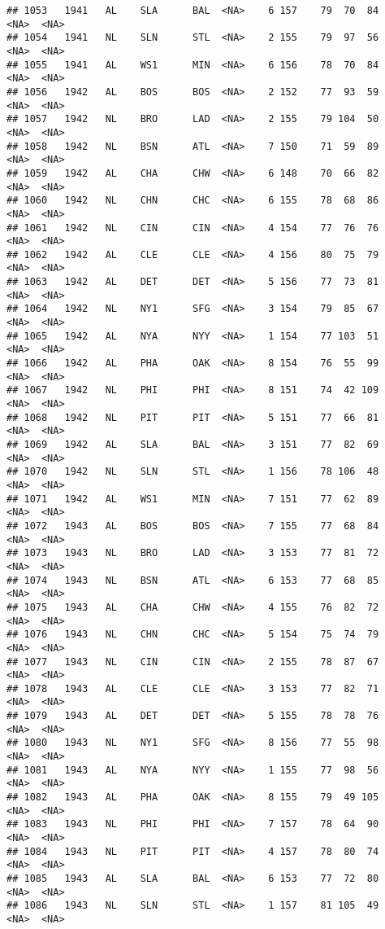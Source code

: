 \documentclass[]{article}
\begin{document}
\begin{verbatim}
## 1053   1941   AL    SLA      BAL  <NA>    6 157    79  70  84   <NA>  <NA>
## 1054   1941   NL    SLN      STL  <NA>    2 155    79  97  56   <NA>  <NA>
## 1055   1941   AL    WS1      MIN  <NA>    6 156    78  70  84   <NA>  <NA>
## 1056   1942   AL    BOS      BOS  <NA>    2 152    77  93  59   <NA>  <NA>
## 1057   1942   NL    BRO      LAD  <NA>    2 155    79 104  50   <NA>  <NA>
## 1058   1942   NL    BSN      ATL  <NA>    7 150    71  59  89   <NA>  <NA>
## 1059   1942   AL    CHA      CHW  <NA>    6 148    70  66  82   <NA>  <NA>
## 1060   1942   NL    CHN      CHC  <NA>    6 155    78  68  86   <NA>  <NA>
## 1061   1942   NL    CIN      CIN  <NA>    4 154    77  76  76   <NA>  <NA>
## 1062   1942   AL    CLE      CLE  <NA>    4 156    80  75  79   <NA>  <NA>
## 1063   1942   AL    DET      DET  <NA>    5 156    77  73  81   <NA>  <NA>
## 1064   1942   NL    NY1      SFG  <NA>    3 154    79  85  67   <NA>  <NA>
## 1065   1942   AL    NYA      NYY  <NA>    1 154    77 103  51   <NA>  <NA>
## 1066   1942   AL    PHA      OAK  <NA>    8 154    76  55  99   <NA>  <NA>
## 1067   1942   NL    PHI      PHI  <NA>    8 151    74  42 109   <NA>  <NA>
## 1068   1942   NL    PIT      PIT  <NA>    5 151    77  66  81   <NA>  <NA>
## 1069   1942   AL    SLA      BAL  <NA>    3 151    77  82  69   <NA>  <NA>
## 1070   1942   NL    SLN      STL  <NA>    1 156    78 106  48   <NA>  <NA>
## 1071   1942   AL    WS1      MIN  <NA>    7 151    77  62  89   <NA>  <NA>
## 1072   1943   AL    BOS      BOS  <NA>    7 155    77  68  84   <NA>  <NA>
## 1073   1943   NL    BRO      LAD  <NA>    3 153    77  81  72   <NA>  <NA>
## 1074   1943   NL    BSN      ATL  <NA>    6 153    77  68  85   <NA>  <NA>
## 1075   1943   AL    CHA      CHW  <NA>    4 155    76  82  72   <NA>  <NA>
## 1076   1943   NL    CHN      CHC  <NA>    5 154    75  74  79   <NA>  <NA>
## 1077   1943   NL    CIN      CIN  <NA>    2 155    78  87  67   <NA>  <NA>
## 1078   1943   AL    CLE      CLE  <NA>    3 153    77  82  71   <NA>  <NA>
## 1079   1943   AL    DET      DET  <NA>    5 155    78  78  76   <NA>  <NA>
## 1080   1943   NL    NY1      SFG  <NA>    8 156    77  55  98   <NA>  <NA>
## 1081   1943   AL    NYA      NYY  <NA>    1 155    77  98  56   <NA>  <NA>
## 1082   1943   AL    PHA      OAK  <NA>    8 155    79  49 105   <NA>  <NA>
## 1083   1943   NL    PHI      PHI  <NA>    7 157    78  64  90   <NA>  <NA>
## 1084   1943   NL    PIT      PIT  <NA>    4 157    78  80  74   <NA>  <NA>
## 1085   1943   AL    SLA      BAL  <NA>    6 153    77  72  80   <NA>  <NA>
## 1086   1943   NL    SLN      STL  <NA>    1 157    81 105  49   <NA>  <NA>

\end{verbatim}
\end{document}
